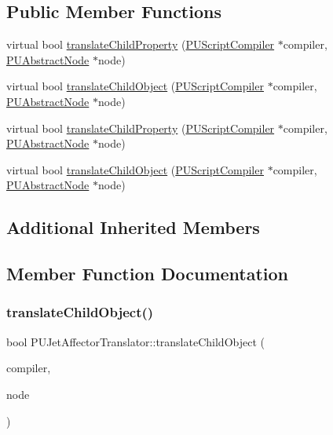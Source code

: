 \subsection*{Public Member Functions}
\begin{DoxyCompactItemize}
\item 
virtual bool \hyperlink{classPUJetAffectorTranslator_a5319614653f76e46c05f3eb6a7981aa4}{translate\+Child\+Property} (\hyperlink{classPUScriptCompiler}{P\+U\+Script\+Compiler} $\ast$compiler, \hyperlink{classPUAbstractNode}{P\+U\+Abstract\+Node} $\ast$node)
\item 
virtual bool \hyperlink{classPUJetAffectorTranslator_a519e55f97a7b25a5c610c95c01782971}{translate\+Child\+Object} (\hyperlink{classPUScriptCompiler}{P\+U\+Script\+Compiler} $\ast$compiler, \hyperlink{classPUAbstractNode}{P\+U\+Abstract\+Node} $\ast$node)
\item 
virtual bool \hyperlink{classPUJetAffectorTranslator_ad9031c782a81a81d75f4dbaa01e88619}{translate\+Child\+Property} (\hyperlink{classPUScriptCompiler}{P\+U\+Script\+Compiler} $\ast$compiler, \hyperlink{classPUAbstractNode}{P\+U\+Abstract\+Node} $\ast$node)
\item 
virtual bool \hyperlink{classPUJetAffectorTranslator_ae289824ba17b49222cbf0ebae660edeb}{translate\+Child\+Object} (\hyperlink{classPUScriptCompiler}{P\+U\+Script\+Compiler} $\ast$compiler, \hyperlink{classPUAbstractNode}{P\+U\+Abstract\+Node} $\ast$node)
\end{DoxyCompactItemize}
\subsection*{Additional Inherited Members}


\subsection{Member Function Documentation}
\mbox{\label{classPUJetAffectorTranslator_a519e55f97a7b25a5c610c95c01782971}} 
\subsubsection{\texorpdfstring{translate\+Child\+Object()}{translateChildObject()}\hspace{0.1cm}{\footnotesize\ttfamily [1/2]}}
{\footnotesize\ttfamily bool P\+U\+Jet\+Affector\+Translator\+::translate\+Child\+Object (\begin{DoxyParamCaption}\item[{\hyperlink{classPUScriptCompiler}{P\+U\+Script\+Compiler} $\ast$}]{compiler,  }\item[{\hyperlink{classPUAbstractNode}{P\+U\+Abstract\+Node} $\ast$}]{node }\end{DoxyParamCaption})\hspace{0.3cm}{\ttfamily [virtual]}}

